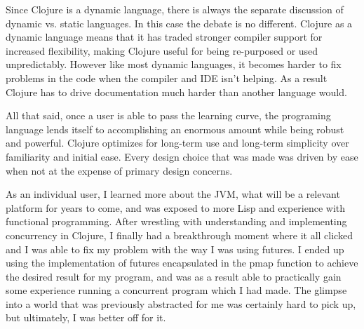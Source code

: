     Since Clojure is a dynamic language, there is always the separate discussion of dynamic vs. static languages. In this case the debate is no different. Clojure as a dynamic language means that it has traded stronger compiler support for increased flexibility, making Clojure useful for being re-purposed or used unpredictably. However like most dynamic languages, it becomes harder to fix problems in the code when the compiler and IDE isn't helping. As a result Clojure has to drive documentation much harder than another language would. 
    
    All that said, once a user is able to pass the learning curve, the programing language lends itself to accomplishing an enormous amount while being robust and powerful. Clojure optimizes for long-term use and long-term simplicity over familiarity and initial ease. Every design choice that was made was driven by ease when not at the expense of primary design concerns.
    
    As an individual user, I learned more about the JVM, what will be a relevant platform for years to come, and was exposed to more Lisp and experience with functional programming. After wrestling with understanding and implementing concurrency in Clojure, I finally had a breakthrough moment where it all clicked and I was able to fix my problem with the way I was using futures. I ended up using the implementation of futures encapsulated in the pmap function to achieve the desired result for my program, and was as a result able to practically gain some experience running a concurrent program which I had made. The glimpse into a world that was previously abstracted for me was certainly hard to pick up, but ultimately, I was better off for it.